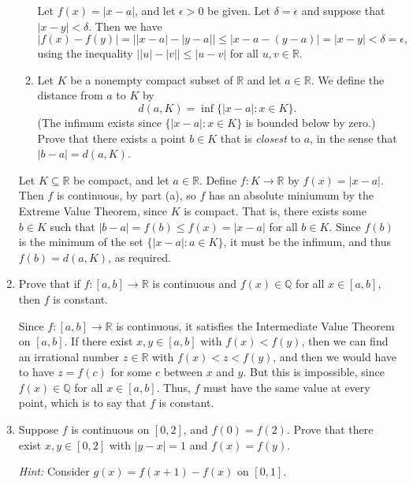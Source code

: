 \documentclass[letterpaper,12pt]{article}
\newcommand{\R}{\mathbb{R}}
\newcommand{\Q}{\mathbb{Q}}
\renewcommand{\ss}{\subseteq}
\newcommand{\abs}[1]{\lvert #1\rvert}
\begin{document}
\begin{enumerate}
\begin{enumerate}
\bigskip

Let $f(x)=\abs{x-a}$, and let $\epsilon>0$ be given. Let $\delta = \epsilon$ and suppose that $\abs{x-y}<\delta$. Then we have
\[
 \abs{f(x)-f(y)} = \abs{\abs{x-a}-\abs{y-a}}\leq \abs{x-a-(y-a)} = \abs{x-y}<\delta=\epsilon,
\]
using the inequality $\abs{\abs{u}-\abs{v}}\leq \abs{u-v}$ for all $u,v\in\R$.

\bigskip

       \item Let $K$ be a nonempty compact subset of $\R$ and let $a\in\R$. We define the distance from $a$ to $K$ by
\[
 d(a,K) = \inf\{\abs{x-a} : x\in K\}.
\]
(The infimum exists since $\{\abs{x-a} : x\in K\}$ is bounded below by zero.) Prove that there exists a point $b\in K$ that is {\em closest} to $a$, in the sense that $\abs{b-a} = d(a,K)$.
      \end{enumerate}

\bigskip

Let $K\ss\R$ be compact, and let $a\in\R$. Define $f:K\to \R$ by $f(x)=\abs{x-a}$. Then $f$ is continuous, by part (a), so $f$ has an absolute miniumum by the Extreme Value Theorem, since $K$ is compact. That is, there exists some $b\in K$ such that $\abs{b-a} = f(b)\leq f(x)=\abs{x-a}$ for all $b\in K$. Since $f(b)$ is the minimum of the set $\{\abs{x-a}:a\in K\}$, it must be the infimum, and thus $f(b)=d(a,K)$, as required.

\bigskip

\item Prove that if $f:[a,b]\to\R$ is continuous and $f(x)\in \Q$ for all $x\in [a,b]$, then $f$ is constant.

\bigskip

Since $f:[a,b]\to\R$ is continuous, it satisfies the Intermediate Value Theorem on $[a,b]$. If there exist $x,y\in [a,b]$ with $f(x)<f(y)$, then we can find an irrational number $z\in\R$ with $f(x)<z<f(y)$, and then we would have to have $z=f(c)$ for some $c$ between $x$ and $y$. But this is impossible, since $f(x)\in\Q$ for all $x\in [a,b]$. Thus, $f$ must have the same value at every point, which is to say that $f$ is constant.

\bigskip

\item Suppose $f$ is continuous on $[0,2]$, and $f(0)=f(2)$. Prove that there exist $x,y\in [0,2]$ with $\abs{y-x}=1$ and $f(x)=f(y)$.

{\em Hint:} Consider $g(x)=f(x+1)-f(x)$ on $[0,1]$.

\bigskip


\end{enumerate}
\end{document}
